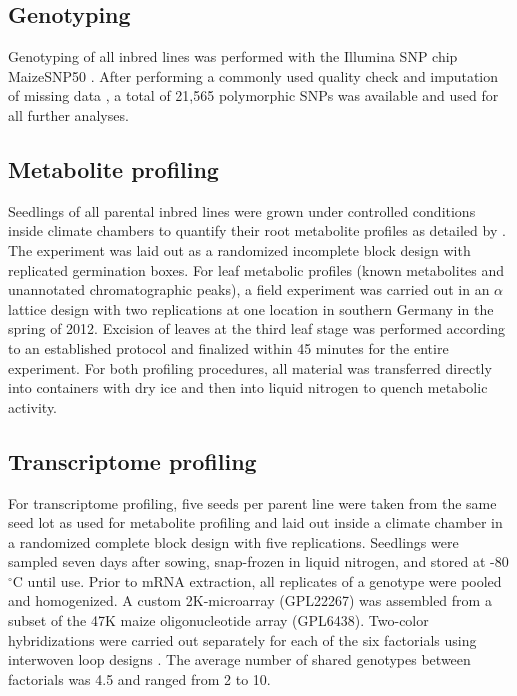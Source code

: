 \documentclass[12pt,titlepage]{article}
\begin{document}
\subsection{Genotyping}
Genotyping of all inbred lines was performed with the Illumina SNP chip
MaizeSNP50 \cite{Ganal2011}.
After performing a commonly used quality check \cite{Technow2014} and 
imputation of missing data \cite{Browning2009}, a total of 21,565 polymorphic 
SNPs was available and used for all further analyses.



\subsection{Metabolite profiling}
Seedlings of all parental inbred lines were grown under controlled conditions 
inside climate chambers to quantify their root metabolite profiles as detailed
by .
The experiment was laid out as a randomized incomplete block design with
replicated germination boxes.
For leaf metabolic profiles (known metabolites and unannotated chromatographic
peaks), a field experiment was carried out in an $\alpha$ lattice design with 
two replications at one location in southern Germany in the spring of 2012.
Excision of leaves at the third leaf stage was performed according to an 
established protocol \cite{Riedelsheimer2012b} and finalized within 45 minutes 
for the entire experiment. 
For both profiling procedures, all material was transferred directly into 
containers with dry ice and then into liquid nitrogen to quench metabolic 
activity.



\subsection{Transcriptome profiling}
For transcriptome profiling, five seeds per parent line were taken from the 
same seed lot as used for metabolite profiling and laid out inside a climate 
chamber in a randomized complete block design with five replications.
Seedlings were sampled seven days after sowing, snap-frozen in liquid nitrogen,
and stored at -80$^{\circ}$C until use.
Prior to mRNA extraction, all replicates of a genotype were pooled and
homogenized.
A custom 2K-microarray (GPL22267) was assembled from a subset of the 47K maize 
oligonucleotide array (GPL6438).
Two-color hybridizations were carried out separately for each of the six 
factorials using interwoven loop designs \cite{Kerr2001}.
The average number of shared genotypes between factorials was 4.5 and ranged 
from 2 to 10.
\end{document}
